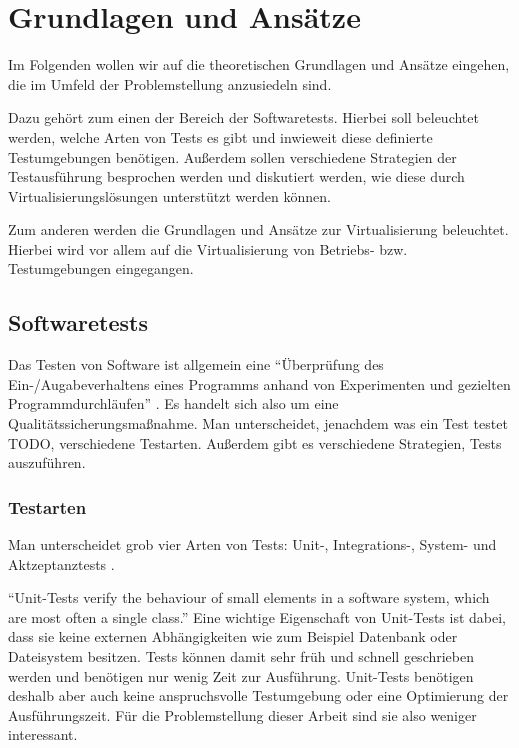 \section{Grundlagen und Ansätze}

Im Folgenden wollen wir auf die theoretischen Grundlagen und Ansätze eingehen, die im Umfeld der Problemstellung anzusiedeln sind.

Dazu gehört zum einen der Bereich der Softwaretests. Hierbei soll beleuchtet werden, welche Arten von Tests es gibt und inwieweit diese definierte Testumgebungen benötigen. Außerdem sollen verschiedene Strategien der Testausführung besprochen werden und diskutiert werden, wie diese durch Virtualisierungslösungen unterstützt werden können.

Zum anderen werden die Grundlagen und Ansätze zur Virtualisierung beleuchtet. Hierbei wird vor allem auf die Virtualisierung von Betriebs- bzw. Testumgebungen eingegangen.

\subsection{Softwaretests}

Das Testen von Software ist allgemein eine "`Überprüfung des Ein-/Augabeverhaltens eines Programms anhand von Experimenten und gezielten Programmdurchläufen"' \citep[S.][S.662]{itduden}. Es handelt sich also um eine Qualitätssicherungsmaßnahme. Man unterscheidet, jenachdem was ein Test testet TODO, verschiedene Testarten. Außerdem gibt es verschiedene Strategien, Tests auszuführen.

\subsubsection{Testarten}

Man unterscheidet grob vier Arten von Tests: Unit-, Integrations-, System- und Aktzeptanztests \citep[Vgl.][S. 129 ff]{DuvMatAnd07}.


"`Unit-Tests verify the behaviour of small elements in a software system, which are most often a single class."' \citep[S.][S. 132]{DuvMatAnd07} Eine wichtige Eigenschaft von Unit-Tests ist dabei, dass sie keine externen Abhängigkeiten wie zum Beispiel Datenbank oder Dateisystem besitzen. Tests können damit sehr früh und schnell geschrieben werden und benötigen nur wenig Zeit zur Ausführung. \citep[Vgl.][S. 133]{DuvMatAnd07} Unit-Tests benötigen deshalb aber auch keine anspruchsvolle Testumgebung oder eine Optimierung der Ausführungszeit. Für die Problemstellung dieser Arbeit sind sie also weniger interessant.

